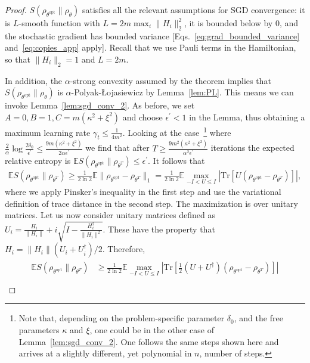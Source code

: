 \documentclass[
    aps,
    prx,
    floatfix,
    nofootinbib,
    onecolumn
]{revtex4-2}
\newcommand{\Tr}{\mathrm{Tr}}
\begin{document}
\begin{proof}
$S(\rho_{\theta^\mathrm{opt}} \| \rho_\theta)$ satisfies all the relevant assumptions for SGD convergence: it is $L$-smooth function with $L=2 m \max_i \| H_i \|_2^2$, it is bounded below by $0$, and the stochastic gradient has bounded variance [Eqs.~\eqref{eq:grad_bounded_variance} and~\eqref{eq:copies_app} apply]. Recall that we use Pauli terms in the Hamiltonian, so that $\| H_i \|_2 = 1$ and $L=2m$.

In addition, the $\alpha$-strong convexity assumed by the theorem implies that $S(\rho_{\theta^\mathrm{opt}} \| \rho_\theta)$ is $\alpha$-Polyak-{\L}ojasiewicz by Lemma~\ref{lem:PL}. This means we can invoke Lemma~\ref{lem:sgd_conv_2}. As before, we set $A=0, B=1, C=m( \kappa^2 + \xi^2)$ and choose $\epsilon^\prime < 1$ in the Lemma, thus obtaining a maximum learning rate $\gamma_t \leq \frac{1}{4m^2}$. Looking at the case~\footnote{Note that, depending on the problem-specific parameter $\delta_0$, and the free parameters $\kappa$ and $\xi$, one could be in the other case of Lemma~\ref{lem:sgd_conv_2}. One follows the same steps shown here and arrives at a slightly different, yet polynomial in $n$, number of steps.} where $\frac{2}{\alpha}\log{\frac{2\delta_0}{\epsilon^\prime}}\leq\frac{9m(\kappa^2 + \xi^2)}{2\alpha \epsilon^\prime}$ we find that after $T \geq \frac{9m^2(\kappa^2 + \xi^2)}{\alpha^2\epsilon^\prime}$ iterations the expected relative entropy is $\mathbb{E} S(\rho_{\theta^\mathrm{opt}} \|\rho_{\theta^T}) \leq \epsilon^\prime$.
It follows that 
\begin{align}
    \mathbb{E} S(\rho_{\theta^\mathrm{opt}} \|\rho_{\theta^T}) \geq \frac{1}{2 \ln 2} \mathbb{E} \| \rho_{\theta^\mathrm{opt}} - \rho_{\theta^T}  \|_1 = \frac{1}{2 \ln 2} \mathbb{E} \max_{-I < U \leq I} | \Tr[ U (\rho_{\theta^\mathrm{opt}} - \rho_{\theta^T}) ] |,
\end{align}
where we apply Pinsker's inequality in the first step and use the variational definition of trace distance in the second step. The maximization is over unitary matrices. Let us now consider unitary matrices defined as $U_i = \frac{H_i}{\| H_i \|} + i \sqrt{ I - \frac{H_i^2}{\| H_i \|^2} }$. These have the property that $H_i = \| H_i \| (U_i + U_i^\dag )/2$. 
Therefore,
\begin{align}
\begin{split}
    \mathbb{E} S(\rho_{\theta^\mathrm{opt}} \|\rho_{\theta^T}) &\geq \frac{1}{2 \ln 2} \mathbb{E} \max_{-I < U \leq I} \left| \Tr[ \frac{1}{2}(U + U^\dag) (\rho_{\theta^\mathrm{opt}} - \rho_{\theta^T}) ] \right| \\

\end{split}
\end{align}
\end{proof}
\end{document}
